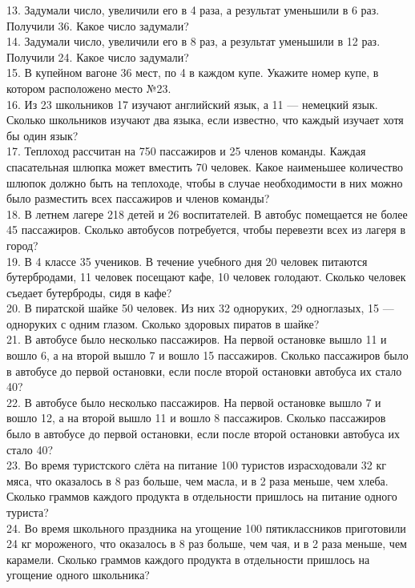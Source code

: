 \documentclass[12pt]{article}
\begin{document}
13. Задумали число, увеличили его в 4 раза, а результат уменьшили в 6 раз. Получили 36. Какое число задумали?\\
14. Задумали число, увеличили его в 8 раз, а результат уменьшили в 12 раз. Получили 24. Какое число задумали?\\
15. В купейном вагоне 36 мест, по 4 в каждом купе. Укажите номер купе, в котором расположено место №23.\\
16. Из 23 школьников 17 изучают английский язык, а 11 --- немецкий язык. Сколько школьников изучают два языка, если известно, что каждый изучает хотя бы один язык?\\
17. Теплоход рассчитан на 750 пассажиров и 25 членов команды. Каждая спасательная шлюпка может вместить 70 человек. Какое наименьшее количество шлюпок должно быть на теплоходе, чтобы в случае необходимости в них можно было разместить всех пассажиров и членов команды?\\
18. В летнем лагере 218 детей и 26 воспитателей. В автобус помещается не более 45 пассажиров. Сколько автобусов потребуется, чтобы перевезти всех из лагеря в город?\\
19. В 4 классе 35 учеников. В течение учебного дня 20 человек питаются бутербродами, 11 человек посещают кафе, 10 человек голодают. Сколько человек съедает бутерброды, сидя в кафе?\\
20. В пиратской шайке 50 человек. Из них 32 одноруких, 29 одноглазых, 15 --- одноруких с одним глазом. Сколько здоровых пиратов в шайке?\\
21. В автобусе было несколько пассажиров. На первой остановке вышло 11 и вошло 6, а на второй вышло 7 и вошло 15 пассажиров. Сколько пассажиров было в автобусе до первой остановки, если после второй остановки автобуса их стало 40?\\
22. В автобусе было несколько пассажиров. На первой остановке вышло 7 и вошло 12, а на второй вышло 11 и вошло 8 пассажиров. Сколько пассажиров было в автобусе до первой остановки, если после второй остановки автобуса их стало 40?\\
23. Во время туристского слёта на питание 100 туристов израсходовали 32 кг мяса, что оказалось в 8 раз больше, чем масла, и в 2 раза меньше, чем хлеба. Сколько граммов каждого продукта в отдельности пришлось на питание одного туриста?\\
24. Во время школьного праздника на угощение 100 пятиклассников приготовили 24 кг мороженого, что оказалось в 8 раз больше, чем чая, и в 2 раза меньше, чем карамели. Сколько граммов каждого продукта в отдельности пришлось на угощение одного школьника?\\
\end{document}
